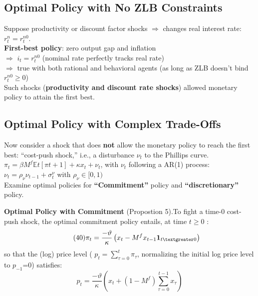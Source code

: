 \documentclass{beamer}
\begin{document}
\subsection{Optimal Policy with No ZLB Constraints}

\begin{frame}{\subsecname}
    Suppose productivity or discount factor shocks $\Rightarrow$ changes real interest rate: $r_{t}^{n} = r_{t}^{n0}$.\\
    \hfill \linebreak
    \textbf{First-best policy}: zero output gap and inflation \\$\Rightarrow$ $i_{t}=r_{t}^{n0}$ (nominal rate perfectly tracks real rate) \\$\Rightarrow$ true with both rational and behavioral agents (as long as ZLB doesn’t bind $r_{t}^{n0}\geq 0$)\\
    \hfill \linebreak
    Such shocks (\textbf{productivity and discount rate shocks}) allowed monetary
    policy to attain the first best.
\end{frame}

\subsection{Optimal Policy with Complex Trade-Offs}

\begin{frame}{\subsecname}
    Now consider a shock that does \textbf{not} allow the monetary policy to reach the first best: “cost-push shock,” i.e., a disturbance $\nu_{t}$ to the Phillips curve.\\
    \hfill \linebreak
    $\pi_{t}=\beta M^{f} \mathbb{E}t\left[\pi{t+1}\right]+\kappa x_{t}+\nu_{t}$, with $\nu_{t}$ following a AR(1) process: $\nu_{t}=\rho_{\nu}\nu_{t-1}+\sigma_{t}^{\nu}$ with $\rho_{\nu}\in[0,1)$\\
    \hfill \linebreak
    Examine optimal policies for \textbf{``Commitment''} policy and \textbf{``discretionary''} policy.
\end{frame}

\begin{frame}{\subsecname}
    \textbf{Optimal Policy with Commitment} (Propostion 5).To fight a time-0 cost-push shock, the optimal commitment policy entails, at time $t \geq 0$ :
    \begin{equation}\tag{40}
        \pi_{t}=\frac{-\vartheta}{\kappa}\left(x_{t}-M^{f}x_{t-1}\textbf{1}_{t\textgreater 0}\right)
    \end{equation}
    so that the (log) price level ( $p_{t}=\sum\limits_{\tau=0}^{t}\pi_{\tau}$, normalizing the initial log price level to $p_{-1}$=0) satisfies:
    \begin{equation}\tag{41}
        p_{t}=\frac{-\vartheta}{\kappa}\left(x_{t}+\left(1-M^{f}\right)\sum_{\tau=0}^{t-1}x_{\tau}\right)
    \end{equation}
\end{frame}
\end{document}
